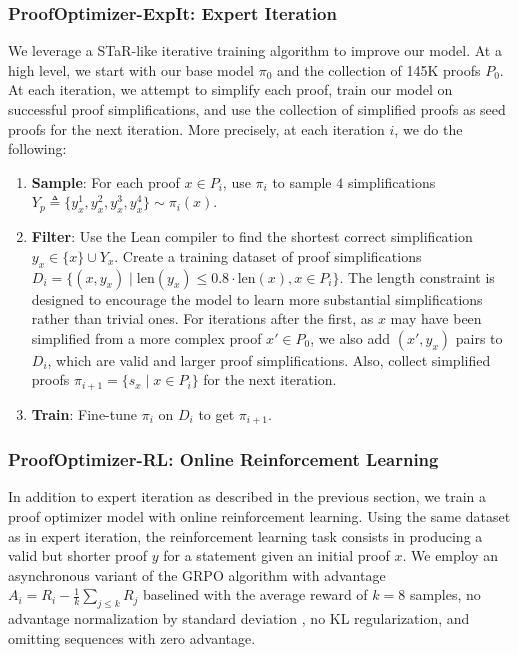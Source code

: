 \subsubsection{ProofOptimizer-ExpIt: Expert Iteration} \label{subsec:iterative-training}
We leverage a STaR-like \citep{zelikman2022star} iterative training algorithm to improve our model. At a high level, we start with our base model $\pi_0$ and the collection of 145K proofs $P_0$. At each iteration, we attempt to simplify each proof, train our model on successful proof simplifications, and use the collection of simplified proofs as seed proofs for the next iteration. More precisely, at each iteration $i$, we do the following:
\begin{enumerate}[leftmargin=0.7cm]
\itemsep1pt
    \item \textbf{Sample}: For each proof $x \in P_i$, use $\pi_i$ to sample $4$ simplifications $Y_p \triangleq \{y_x^{1}, y_x^{2}, y_x^{3}, y_x^{4}\} \sim \pi_i(x)$.
    \item \textbf{Filter}: Use the Lean compiler to find the shortest correct simplification $y_x \in \{x\} \cup Y_x$. Create a training dataset of proof simplifications $D_i = \{(x, y_x) \mid \text{len}(y_x) \le 0.8 \cdot \text{len}(x), x \in P_i\}$. The length constraint is designed to encourage the model to learn more substantial simplifications rather than trivial ones. For iterations after the first, as $x$ may have been simplified from a more complex proof $x' \in P_0$, we also add $(x', y_x)$ pairs to $D_i$, which are valid and larger proof simplifications. Also, collect simplified proofs $\pi_{i+1} = \{s_x \mid x \in P_i\}$ for the next iteration. 
    \item \textbf{Train}: Fine-tune $\pi_i$ on $D_i$ to get $\pi_{i+1}$.
\end{enumerate}


\subsubsection{ProofOptimizer-RL: Online Reinforcement Learning} \label{sec:rl}
In addition to expert iteration as described in the previous section, we train a proof optimizer model with online reinforcement learning. Using the same dataset as in expert iteration, the reinforcement learning task consists in producing a valid but shorter proof $y$ for a statement given an initial proof $x$.  We employ an asynchronous variant of the GRPO algorithm \citep{shao2024grpo} with advantage $A_i = R_i - \frac{1}{k}\sum_{j \leq k} R_j$
baselined with the average reward of $k = 8$ samples, no advantage normalization by standard deviation \citep{liu2025understandingr1zeroliketrainingcritical}, no KL regularization, and omitting sequences with zero advantage.


